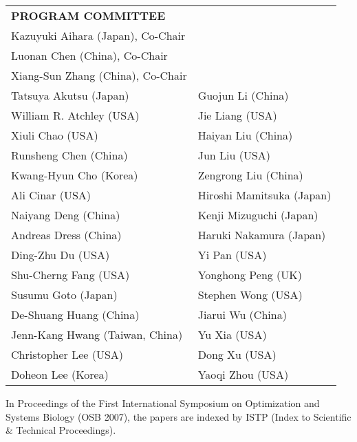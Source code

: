  \bigskip

 \noindent
 \begin{tabular}{@{}p{}p{}@{}}
  {\bf PROGRAM COMMITTEE}             \medskip \\
  Kazuyuki Aihara (Japan), Co-Chair \\
  Luonan Chen (China), Co-Chair     \\
  Xiang-Sun Zhang (China), Co-Chair \\
  Tatsuya Akutsu (Japan)           & Guojun Li (China)         \\
  William R. Atchley (USA)         & Jie Liang (USA)           \\
  Xiuli Chao (USA)                 & Haiyan Liu (China)        \\
  Runsheng Chen (China)            & Jun Liu (USA)             \\
  Kwang-Hyun Cho (Korea)           & Zengrong Liu (China)      \\
  Ali Cinar (USA)                  & Hiroshi Mamitsuka (Japan) \\
  Naiyang Deng (China)             & Kenji Mizuguchi (Japan)   \\
  Andreas Dress (China)            & Haruki Nakamura (Japan)   \\
  Ding-Zhu Du (USA)                & Yi Pan (USA)              \\
  Shu-Cherng Fang (USA)            & Yonghong Peng (UK)        \\
  Susumu Goto (Japan)              & Stephen Wong (USA)        \\
  De-Shuang Huang (China)          & Jiarui Wu (China)         \\
  Jenn-Kang Hwang (Taiwan, China)  & Yu Xia (USA)              \\
  Christopher Lee (USA)            & Dong Xu (USA)             \\
  Doheon Lee (Korea)               & Yaoqi Zhou (USA)          \\
 \end{tabular}

 \bigskip


 \medskip

 \noindent
In Proceedings of the First International Symposium on Optimization
and Systems Biology (OSB 2007), the papers are indexed by ISTP
(Index to Scientific \& Technical Proceedings).

